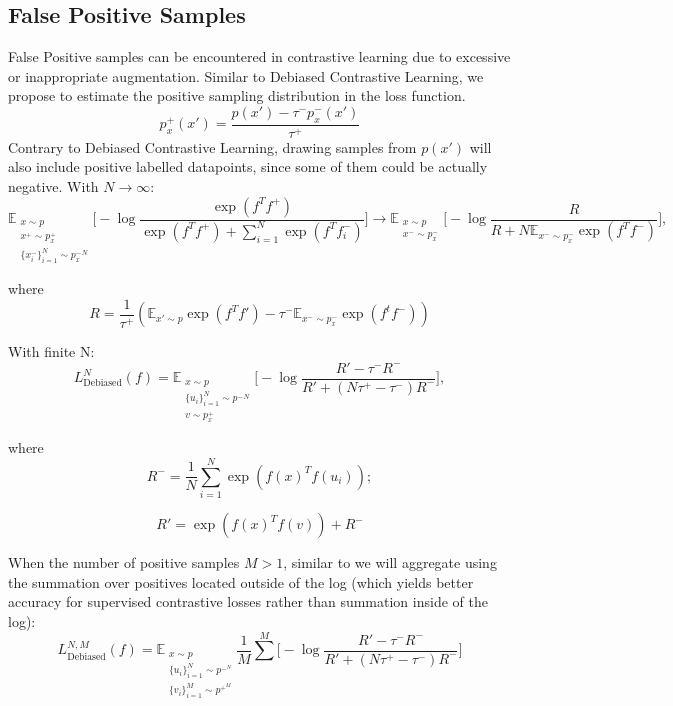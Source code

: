 \documentclass{article}
\begin{document}
\subsection{False Positive Samples} \label{FP}
False Positive samples can be encountered in contrastive learning due to excessive or inappropriate augmentation. Similar to Debiased Contrastive Learning, we propose to estimate the positive sampling distribution in the loss function.
\begin{equation}
p_x^+ (x') = \frac{p(x') - \tau^- p^-_x(x')}{\tau^+}
\end{equation}
Contrary to Debiased Contrastive Learning, drawing samples from $p(x')$ will also include positive labelled datapoints, since some of them could be actually negative. With $N \to \infty$:
\begin{equation}
\mathbb{E}_{\substack{x \sim p \\ x^+ \sim p_x^+ \\ \{x_i^-\}_{i=1}^N \sim {p_x^-}^N}} \bigg[ - \log \frac{\exp(f^T f^+)}{\exp(f^T f^+) + \sum_{i=1}^N \exp(f^T f_i^-)} \bigg] \longrightarrow \mathbb{E}_{\substack{x \sim p \\ x^- \sim p_x^-}} \bigg[ - \log \frac{R}{R + N \mathbb{E}_{x^- \sim p_x^-} \exp(f^T f^-)} \bigg],
\end{equation}

where
\begin{equation}
R = \frac{1}{\tau^+} (\mathbb{E}_{x' \sim p} \exp(f^Tf') - \tau^- \mathbb{E}_{x^- \sim p_x^-} \exp(f^tf^-))
\end{equation}

With finite N:
\begin{equation} \label{eq:11}
L_{\text{Debiased}}^N (f) = \mathbb{E}_{\substack{x \sim p \\ \{u_i\}_{i=1}^N \sim {p^-}^N \\ v \sim p_x^+}} \bigg[-\log \frac{R' - \tau^- R^-}{R' + (N \tau^+ - \tau^-) R^-}\bigg],
\end{equation}

where
\begin{equation}
R^-= \frac{1}{N} \sum\limits_{i=1}^N \exp(f(x)^Tf(u_i));
\end{equation}

\begin{equation}
R' = \exp(f(x)^T f(v)) + R^-
\end{equation}

When the number of positive samples $M > 1$, similar to \citep{khosla2021supervised} we will aggregate using the summation over positives located outside of the log (which yields better accuracy for supervised contrastive losses rather than summation inside of the log):
\begin{equation} \label{eq:14}
L_{\text{Debiased}}^{N, M} (f) = \mathbb{E}_{\substack{x \sim p \\ \{u_i\}_{i=1}^N \sim p^-^N \\ \{v_i\}_{i=1}^M\sim p^+^M}} \frac{1}{M} \sum\limits^M \bigg[-\log \frac{R' - \tau^- R^-}{R' + (N \tau^+ - \tau^-) R^-}\bigg]
\end{equation}
\end{document}
